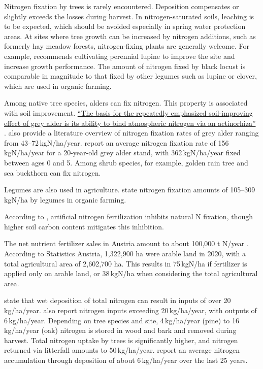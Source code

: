 Nitrogen fixation by trees is rarely encountered. Deposition compensates or slightly exceeds the losses during harvest. In nitrogen-saturated soils, leaching is to be expected, which should be avoided especially in spring water protection areas. At sites where tree growth can be increased by nitrogen additions, such as formerly hay meadow forests, nitrogen-fixing plants are generally welcome. For example, \citet{wiedemann1951ertragskunde} recommends cultivating perennial lupine to improve the site and increase growth performance. The amount of nitrogen fixed by black locust is comparable in magnitude to that fixed by other legumes such as lupine or clover, which are used in organic farming.

Among native tree species, alders can fix nitrogen. This property is associated with soil improvement. \hyperlink{german:schuett2014alnusIncarna}{\enquote{The basis for the repeatedly emphasized soil-improving effect of grey alder is its ability to bind atmospheric nitrogen via an actinorhiza}} \citep[own translation]{schuett2014alnusIncarna}.
\citet{schuett2014alnusIncarna} also provide a literature overview of nitrogen fixation rates of grey alder ranging from 43–72\,kgN/ha/year.
\citet{cleve1971grauerle} report an average nitrogen fixation rate of 156\,kgN/ha/year for a 20-year-old grey alder stand, with 362\,kgN/ha/year fixed between ages 0 and 5.
Among shrub species, for example, golden rain tree and sea buckthorn can fix nitrogen.

Legumes are also used in agriculture. \citet{kolbe2008stickstoff} state nitrogen fixation amounts of 105–309\,kgN/ha by legumes in organic farming.

According to \citet{zheng2023nFixierung}, artificial nitrogen fertilization inhibits natural N fixation, though higher soil carbon content mitigates this inhibition.

The net nutrient fertilizer sales in Austria amount to about 100,000 t N/year \citep{ama2024duengemittel}. According to Statistics Austria, 1,322,900 ha were arable land in 2020, with a total agricultural area of 2,602,700 ha. This results in 75\,kgN/ha if fertilizer is applied only on arable land, or 38\,kgN/ha when considering the total agricultural area.

\citet{uba1998deposition} state that wet deposition of total nitrogen can result in inputs of over 20\,kg/ha/year.
\citet{raspe2018stickstoff} also report nitrogen inputs exceeding 20\,kg/ha/year, with outputs of 6\,kg/ha/year. Depending on tree species and site, 4\,kg/ha/year (pine) to 16\,kg/ha/year (oak) nitrogen is stored in wood and bark and removed during harvest. Total nitrogen uptake by trees is significantly higher, and nitrogen returned via litterfall amounts to 50\,kg/ha/year.
\citet{raspe2018stickstoff} report an average nitrogen accumulation through deposition of about 6\,kg/ha/year over the last 25 years.

